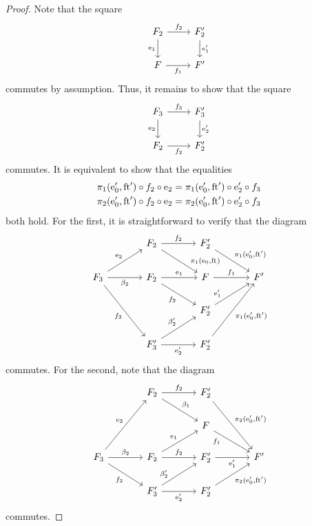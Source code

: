 \begin{proof}
Note that the square
\begin{equation*}
\begin{tikzcd}
\stesysf_2
  \ar{r}{f_2}
  \ar{d}[swap]{\efamext}
  &
\stesysf_2'
  \ar{d}{\efamext'}
  \\
\stesysf
  \ar{r}[swap]{f_1}
  &
\stesysf'
\end{tikzcd}
\end{equation*}
commutes by assumption. Thus, it remains to show that the square
\begin{equation*}
\begin{tikzcd}
\stesysf_3
  \ar{r}{f_3}
  \ar{d}[swap]{\eext{2}}
  &
\stesysf_3'
  \ar{d}{\eext{2}'}
  \\
\stesysf_2
  \ar{r}[swap]{f_2}
  &
\stesysf_2'
\end{tikzcd}
\end{equation*}
commutes. It is equivalent to show that the equalities
\begin{align*}
\pi_{1}(\mathrm{e}_{0}',\mathrm{ft}_{}')\circ f_2\circ\mathrm{e}_{2}
  & =
\pi_{1}(\mathrm{e}_{0}',\mathrm{ft}_{}')\circ \mathrm{e}_{2}'\circ f_3
  \\
\pi_{2}(\mathrm{e}_{0}',\mathrm{ft}_{}')\circ f_2\circ\mathrm{e}_{2}
  & =
\pi_{2}(\mathrm{e}_{0}',\mathrm{ft}_{}')\circ \mathrm{e}_{2}'\circ f_3
\end{align*}
both hold. For the first, it is straightforward to verify that the diagram
\begin{equation*}
\begin{tikzcd}[column sep=large]
{} &
\stesysf_2
  \ar{r}{f_2}
  \ar{dr}[near end]{\pullbackpr{1}{\ectxext}{\eft}}
  &
\stesysf_2'
  \ar{dr}{\pullbackpr{1}{\ectxext'}{\eft'}}
  \\
\stesysf_3
  \ar{ur}{\eext{2}}
  \ar{r}[swap]{\beta_2}
  \ar{ddr}[swap]{f_3}
  &
\stesysf_2
  \ar{r}{\efamext}
  \ar{dr}[swap]{f_2}
  &
\stesysf
  \ar{r}{f_1}
  &
\stesysf'
  \\
{} & {} &
\stesysf_2'
  \ar{ur}[near start]{\efamext'}
  \\
{} &
\stesysf_3'
  \ar{r}[swap]{\eext{2}'}
  \ar{ur}{\beta_2'}
  &
\stesysf_2'
  \ar{uur}[swap]{\pullbackpr{1}{\ectxext'}{\eft'}}
\end{tikzcd}
\end{equation*}
commutes. For the second, note that the diagram
\begin{equation*}
\begin{tikzcd}[column sep=large]
{} &
\stesysf_2
  \ar{r}{f_2}
  \ar{dr}{\beta_1}
  &
\stesysf_2'
  \ar{ddr}{\pullbackpr{2}{\ectxext'}{\eft'}}
  \\
{} & {} &
\stesysf
  \ar{dr}[swap,near start]{f_1}
  \\
\stesysf_3
  \ar{uur}{\eext{2}}
  \ar{r}{\beta_2}
  \ar{dr}[swap]{f_3}
  &
\stesysf_2
  \ar{r}{f_2}
  \ar{ur}{\efamext}
  &
\stesysf_2'
  \ar{r}[swap]{\efamext'}
  &
\stesysf'
  \\
{} &
\stesysf_3'
  \ar{r}[swap]{\eext{2}'}
  \ar{ur}[near start]{\beta_2'}
  &
\stesysf_2'
  \ar{ur}[swap]{\pullbackpr{2}{\ectxext'}{\eft'}}
\end{tikzcd}
\end{equation*}
commutes.
\end{proof}

